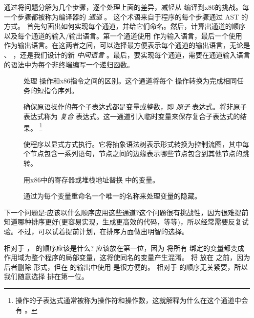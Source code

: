 \documentclass[11pt]{book}
\begin{document}
通过将问题分解为几个步骤，逐个处理上面的差异，减轻从 \LangVar{} 编译到x86的挑战。每一个步骤都被称为编译器的 \emph{通道} 。
%
这个术语来自于程序的每个步骤通过 AST 的方式。
%
首先勾画出如何实现每个通道，并给它们命名。然后，计算出通道的顺序以及每个通道的输入/输出语言。第一个通道使用
\LangVar{} 作为输入语言，最后一个使用 \LangXInt{} 作为输出语言。在这两者之间，可以选择最方便表示每个通道的输出语言，无论是 \LangVar{} 、 \LangXInt{} ，还是我们设计的新 \emph{中间语言} 。最后，要实现每个通道，需要在通道输入语言的语法中为每个非终端编写一个递归函数。

\begin{description}
\item[] 处理
  \LangVar{} 操作和x86指令之间的区别。这个通道将每个
  \LangVar{} 操作转换为完成相同任务的短指令序列。

\item[] 确保原语操作的每个子表达式都是变量或整数，即
  \emph{原子} 表达式。将非原子表达式称为
  \emph{复合} 表达式。这一通道引入临时变量来保存复合子表达式的结果。%
  \footnote{操作的子表达式通常被称为操作符和操作数，这就解释为什么在这个通道中会有
     。}
  
\item[] 使程序以显式方式执行。它将抽象语法树表示形式转换为控制流图，其中每个节点包含一系列语句，节点之间的边缘表示哪些节点包含到其他节点的跳转。

\item[] 用x86中的寄存器或堆栈地址替换 \LangVar{} 中的变量。

\item[] 通过为每个变量重命名一个唯一的名称来处理变量的隐藏。
\end{description}

下一个问题是:应该以什么顺序应用这些通道?这个问题很有挑战性，因为很难提前知道哪种排序更好(更容易实现，生成更高效的代码，等等)，所以经常需要反复试验。不过，可以试着提前计划，在排序方面做出明智的选择。

相对于 ，  的顺序应该是什么?  应该放在第一位，因为
 将所有  绑定的变量都变成作用域为整个程序的局部变量，这将使同名的变量产生混淆。
%
将  放在 
之前，因为后者删除  形式，但在  的输出中使用  是很方便的。
%
  相对于
 的顺序无关紧要，所以我们随意选择
 排在第一位。
\end{document}
